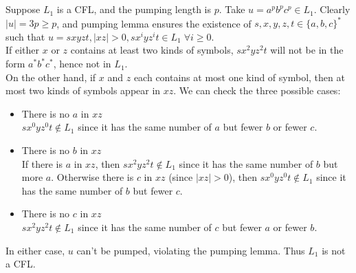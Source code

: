 \documentclass{article}
\begin{document}
\begin{center}
            \end{center}
        
    \section{}
        \subsection{}
            Suppose $L_1$ is a CFL, and the pumping length is $p$. Take $u = a^p b^p c^p \in L_1$. Clearly $|u| = 3p \geq p$, and pumping lemma ensures the existence of $s, x, y, z, t \in \{a, b, c\}^*$ such that $u = sxyzt, |xz| > 0, s x^i y z^i t \in L_1 \; \forall i \geq 0$. \\
            If either $x$ or $z$ contains at least two kinds of symbols, $s x^2 y z^2 t$ will not be in the form $a^* b^* c^*$, hence not in $L_1$. \\
            On the other hand, if $x$ and $z$ each contains at most one kind of symbol, then at most two kinds of symbols appear in $xz$. We can check the three possible cases:
            \begin{itemize}
                \item There is no $a$ in $xz$ \\
                    $s x^0 y z^0 t \notin L_1$ since it has the same number of $a$ but fewer $b$ or fewer $c$.
                \item There is no $b$ in $xz$ \\
                    If there is $a$ in $xz$, then $s x^2 y z^2 t \notin L_1$ since it has the same number of $b$ but more $a$. Otherwise there is $c$ in $xz$ (since $|xz| > 0$), then $s x^0 y z^0 t \notin L_1$ since it has the same number of $b$ but fewer $c$.
                \item There is no $c$ in $xz$ \\
                    $s x^2 y z^2 t \notin L_1$ since it has the same number of $c$ but fewer $a$ or fewer $b$.
            \end{itemize}
            In either case, $u$ can't be pumped, violating the pumping lemma. Thus $L_1$ is not a CFL.
        
\end{document}
